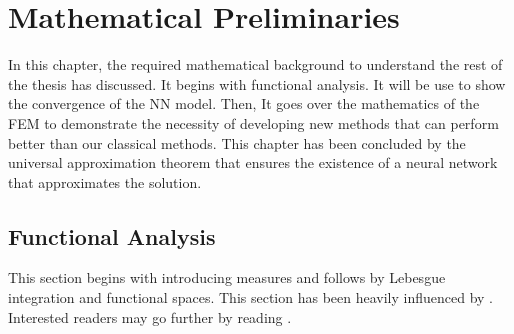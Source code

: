 \chapter{Mathematical Preliminaries}
In this chapter, the required mathematical background to understand the rest of the thesis has discussed. It begins with functional analysis. It will be use to show the convergence of the NN model. Then, It goes over the mathematics of the FEM to demonstrate the necessity of developing new methods that can perform better than our classical methods. This chapter has been concluded by the universal approximation theorem that ensures the existence of a neural network that approximates the solution. 
\section{Functional Analysis}
\label{sec:functional_analysis}
This section begins with introducing measures and follows by  Lebesgue integration and functional spaces. This section has been heavily influenced by \cite{UQIntro_Sullivan}. Interested readers may go further by reading \cite{UQIntro_Sullivan, rudin1991functional}.
